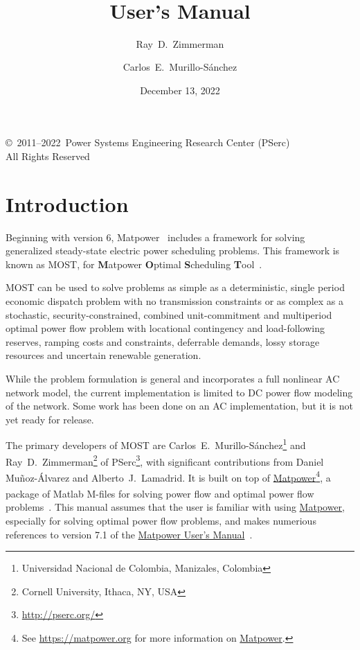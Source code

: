 \documentclass[12pt]{article}
\title{\mostname{}\\\most{} \mostver{}\\
User's Manual}
\author{Ray~D.~Zimmerman \and Carlos~E.~Murillo-S\'anchez}
\date{December 13, 2022} %
\newcommand{\mpver}[0]{7.1}
\newcommand{\matlab}[0]{{\sc Matlab}}
\newcommand{\matpower}[0]{{\sc Matpower}}
\newcommand{\matpowerurl}[0]{https://matpower.org}
\newcommand{\matpowerlink}[0]{\href{\matpowerurl}{\matpower{}}}
\newcommand{\most}[0]{{MOST}}
\newcommand{\mostname}[0]{{{\bf M}{\sc atpower} \textbf{O}ptimal \textbf{S}cheduling \textbf{T}ool}}
\newcommand{\pserc}[0]{{\sc PSerc}}
\newcommand{\PSERC}[0]{{Power Systems Engineering Research Center (\pserc{})}}
\newcommand{\mumurl}[0]{https://matpower.org/docs/MATPOWER-manual-\mpver.pdf}
\newcommand{\mum}[0]{\href{\mumurl}{\matpower{} User's Manual}}
\numberwithin{equation}{section}
\numberwithin{table}{section}
\numberwithin{figure}{section}
\begin{document}
\maketitle
\thispagestyle{empty}
\vfill
\begin{center}
{\scriptsize
\copyright~2011--2022~\PSERC{}\\
All Rights Reserved}
\end{center}

\clearpage
\tableofcontents
\clearpage
\listoffigures
\listoftables

\clearpage
\section{Introduction}

Beginning with version 6, \matpower{}~\cite{zimmerman2011,matpower,matpower_manual} includes a framework for solving generalized steady-state electric power scheduling problems. This framework is known as \most{}, for \mostname{}~\cite{murillo-sanchez2013a,lamadrid2018}.

\most{} can be used to solve problems as simple as a deterministic, single period economic dispatch problem with no transmission constraints or as complex as a stochastic, security-constrained, combined unit-commitment and multiperiod optimal power flow problem with locational contingency and load-following reserves, ramping costs and constraints, deferrable demands, lossy storage resources and uncertain renewable generation.

While the problem formulation is general and incorporates a full nonlinear AC network model, the current implementation is limited to DC power flow modeling of the network. Some work has been done on an AC implementation, but it is not yet ready for release.

The primary developers of \most{} are Carlos~E.~Murillo-S\'anchez\footnote{Universidad Nacional de Colombia, Manizales, Colombia} and Ray~D.~Zimmerman\footnote{Cornell University, Ithaca, NY, USA} of \pserc{}\footnote{\url{http://pserc.org/}}, with significant contributions from Daniel Mu\~noz-\'Alvarez and Alberto~J.~Lamadrid. It is built on top of \matpowerlink{}\footnote{See \url{\matpowerurl} for more information on \matpowerlink{}.}, a package of \matlab{}\textsuperscript{\tiny \textregistered} M-files for solving power flow and optimal power flow problems~\cite{zimmerman2011, zimmerman2009}. This manual assumes that the user is familiar with using \matpowerlink{}, especially for solving optimal power flow problems, and makes numerious references to version \mpver{} of the \mum{}~\cite{matpower_manual}.
\end{document}
